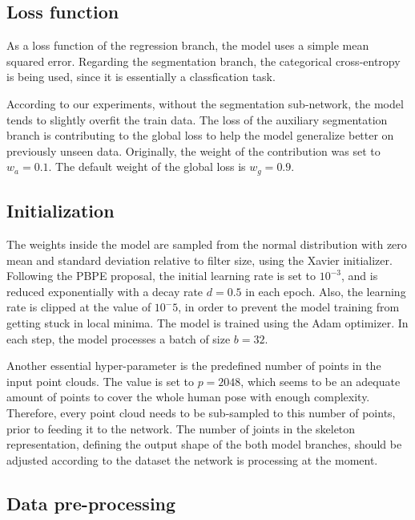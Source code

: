 \subsection{Loss function}
As a loss function of the regression branch, the model uses a simple mean squared error. Regarding the segmentation branch, the categorical cross-entropy is being used, since it is essentially a classfication task.\par
\vspace{5mm}
\noindent
According to our experiments, without the segmentation sub-network, the model tends to slightly overfit the train data. The loss of the auxiliary segmentation branch is contributing to the global loss to help the model generalize better on previously unseen data. Originally, the weight of the contribution was set to $w_a=0.1$. The default weight of the global loss is $w_g = 0.9$. 


\subsection{Initialization} 
The weights inside the model are sampled from the normal distribution with zero mean and standard deviation relative to filter size, using the Xavier initializer. Following the PBPE proposal, the initial learning rate is set to $10^{-3}$, and is reduced exponentially with a decay rate $d = 0.5$ in each epoch. Also, the learning rate is clipped at the value of $10^-5$, in order to prevent the model training from getting stuck in local minima. The model is trained using the Adam optimizer. In each step, the model processes a batch of size $b=32$.\par
\vspace{5mm}
\noindent Another essential hyper-parameter is the predefined number of points in the input point clouds. The value is set to $p=2048$, which seems to be an adequate amount of points to cover the whole human pose with enough complexity. Therefore, every point cloud needs to be sub-sampled to this number of points, prior to feeding it to the network. The number of joints in the skeleton representation, defining the output shape of the both model branches, should be adjusted according to the dataset the network is processing at the moment.

\subsection{Data pre-processing}

